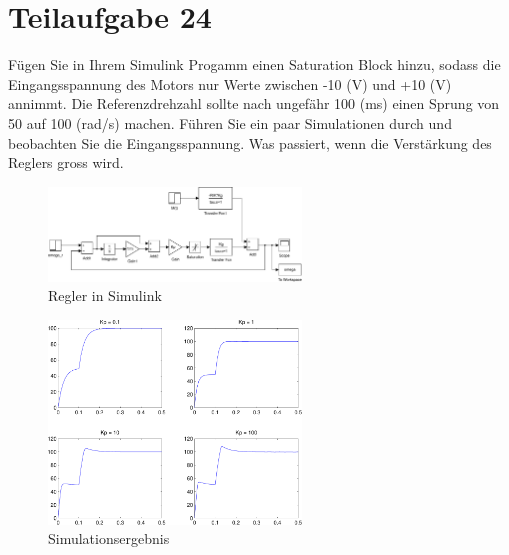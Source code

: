 \section{Teilaufgabe 24}
\begin{aufgabe}
    Fügen Sie in Ihrem Simulink Progamm einen Saturation Block hinzu, sodass 
    die Eingangsspannung des Motors nur Werte zwischen -10 (V) und +10 (V) 
    annimmt.  Die Referenzdrehzahl sollte nach ungefähr 100 (ms) einen Sprung 
    von 50 auf 100 (rad/s) machen. Führen Sie ein paar Simulationen durch und 
    beobachten Sie die Eingangsspannung. Was passiert, wenn die Verstärkung 
    des Reglers gross wird.
\end{aufgabe}
\begin{figure}[h!]
    \centering
    \includegraphics[width=0.6\textwidth]{24/regler_sat.pdf}
    \caption{Regler in Simulink}
    \label{fig:24}
\end{figure}
\begin{figure}[h!]
    \centering
    \includegraphics[width=0.6\textwidth]{24/regler_sat_plot.pdf}
    \caption{Simulationsergebnis}
    \label{fig:24plot}
\end{figure}
